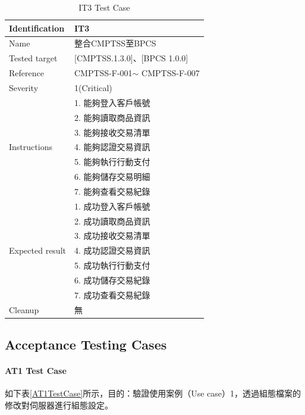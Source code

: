					\begin{table}[htbp]
					\caption{IT3 Test Case} %
					\centering %
					\label{IT3TestCase} %
					\begin{tabular}{|l|l|}
					\hline
					Identification & IT3 \\ \hline
					Name & 整合CMPTSS至BPCS \\ \hline
					Tested target & {[}CMPTSS.1.3.0{]}、{[}BPCS 1.0.0{]} \\ \hline
					Reference & CMPTSS-F-001$\sim$ CMPTSS-F-007 \\ \hline
					Severity & 1(Critical) \\ \hline
					\multirow{7}{*}{Instructions} & 1.     能夠登入客戶帳號 \\ \cline{2-2} 
					 & 2.     能夠讀取商品資訊 \\ \cline{2-2} 
					 & 3.     能夠接收交易清單 \\ \cline{2-2} 
					 & 4.     能夠認證交易資訊 \\ \cline{2-2} 
					 & 5.     能夠執行行動支付 \\ \cline{2-2} 
					 & 6.     能夠儲存交易明細 \\ \cline{2-2} 
					 & 7.     能夠查看交易紀錄 \\ \hline
					\multirow{7}{*}{Expected result} & 1.     成功登入客戶帳號 \\ \cline{2-2} 
					 & 2.     成功讀取商品資訊 \\ \cline{2-2} 
					 & 3.     成功接收交易清單 \\ \cline{2-2} 
					 & 4.     成功認證交易資訊 \\ \cline{2-2} 
					 & 5.     成功執行行動支付 \\ \cline{2-2} 
					 & 6.     成功儲存交易紀錄 \\ \cline{2-2} 
					 & 7.     成功查看交易紀錄 \\ \hline
					Cleanup & 無 \\ \hline
					\end{tabular}
					\end{table}

		\subsection{Acceptance Testing Cases}
			\paragraph{AT1 Test Case}
				如下表\ref{AT1TestCase}所示，目的：驗證使用案例（Use case）1，透過組態檔案的修改對伺服器進行組態設定。

